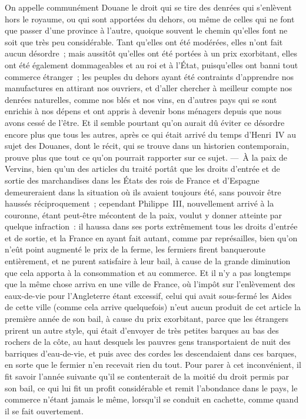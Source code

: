 \documentclass[french,twoside]{book} %
\begin{document}
On appelle communément Douane le droit qui se tire des denrées qui s’enlèvent hors le royaume, ou qui sont apportées du dehors, ou même de celles qui ne font que passer d’une province à l’autre, quoique souvent le chemin qu’elles font ne soit que très peu considérable. Tant qu’elles ont été modérées, elles n’ont fait aucun désordre ; mais aussitôt qu’elles ont été portées à un prix exorbitant, elles ont été également dommageables et au roi et à l’État, puisqu’elles ont banni tout commerce étranger ; les peuples du dehors ayant été contraints d’apprendre nos manufactures en attirant nos ouvriers, et d’aller chercher à meilleur compte nos denrées naturelles, comme nos blés et nos vins, en d’autres pays qui se sont enrichis à nos dépens et ont appris à devenir bons ménagers depuis que nous avons cessé de l’être. Et il semble pourtant qu’on aurait dû éviter ce désordre encore plus que tous les autres, après ce qui était arrivé du temps d’Henri IV au sujet des Douanes, dont le récit, qui se trouve dans un historien contemporain, prouve plus que tout ce qu’on pourrait rapporter sur ce sujet. — À la paix de Vervins, bien qu’un des articles du traité portât que les droits d’entrée et de sortie des marchandises dans les États des rois de France et d’Espagne demeureraient dans la situation où ils avaient toujours été, sans pouvoir être haussés réciproquement ; cependant Philippe III, nouvellement arrivé à la couronne, étant peut-être mécontent de la paix, voulut y donner atteinte par quelque infraction : il haussa dans ses ports extrêmement tous les droits d’entrée et de sortie, et la France en ayant fait autant, comme par représailles, bien qu’on n’eût point augmenté le prix de la ferme, les fermiers firent banqueroute entièrement, et ne purent satisfaire à leur bail, à cause de la grande diminution que cela apporta à la consommation et au commerce. Et il n’y a pas longtemps que la même chose arriva en une ville de France, où l’impôt sur l’enlèvement des eaux-de-vie pour l’Angleterre étant excessif, celui qui avait sous-fermé les Aides de cette ville (comme cela arrive quelquefois) n’eut aucun produit de cet article la première année de son bail, à cause du prix exorbitant, parce que les étrangers prirent un autre style, qui était d’envoyer de très petites barques au bas des rochers de la côte, au haut desquels les pauvres gens transportaient de nuit des barriques d’eau-de-vie, et puis avec des cordes les descendaient dans ces barques, en sorte que le fermier n’en recevait rien du tout. Pour parer à cet inconvénient, il fit savoir l’année suivante qu’il se contenterait de la moitié du droit permis par son bail, ce qui lui fit un profit considérable et remit l’abondance dans le pays, le commerce n’étant jamais le même, lorsqu’il se conduit en cachette, comme quand il se fait ouvertement.\par
\end{document}
